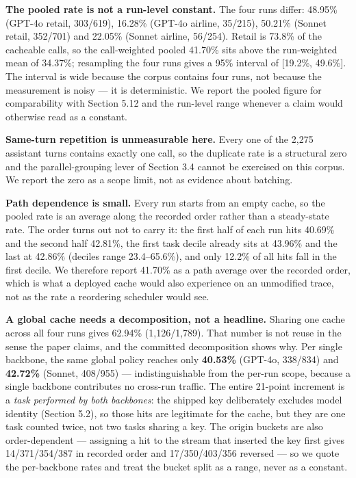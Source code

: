 \documentclass[
  11pt,
]{article}
\begin{document}
\textbf{The pooled rate is not a run-level constant.} The four runs
differ: 48.95\% (GPT-4o retail, 303/619), 16.28\% (GPT-4o airline,
35/215), 50.21\% (Sonnet retail, 352/701) and 22.05\% (Sonnet airline,
56/254). Retail is 73.8\% of the cacheable calls, so the call-weighted
pooled 41.70\% sits above the run-weighted mean of 34.37\%; resampling
the four runs gives a 95\% interval of {[}19.2\%, 49.6\%{]}. The
interval is wide because the corpus contains four runs, not because the
measurement is noisy --- it is deterministic. We report the pooled
figure for comparability with Section 5.12 and the run-level range
whenever a claim would otherwise read as a constant.

\textbf{Same-turn repetition is unmeasurable here.} Every one of the
2,275 assistant turns contains exactly one call, so the duplicate rate
is a structural zero and the parallel-grouping lever of Section 3.4
cannot be exercised on this corpus. We report the zero as a scope limit,
not as evidence about batching.

\textbf{Path dependence is small.} Every run starts from an empty cache,
so the pooled rate is an average along the recorded order rather than a
steady-state rate. The order turns out not to carry it: the first half
of each run hits 40.69\% and the second half 42.81\%, the first task
decile already sits at 43.96\% and the last at 42.86\% (deciles range
23.4--65.6\%), and only 12.2\% of all hits fall in the first decile. We
therefore report 41.70\% as a path average over the recorded order,
which is what a deployed cache would also experience on an unmodified
trace, not as the rate a reordering scheduler would see.

\textbf{A global cache needs a decomposition, not a headline.} Sharing
one cache across all four runs gives 62.94\% (1,126/1,789). That number
is not reuse in the sense the paper claims, and the committed
decomposition shows why. Per single backbone, the same global policy
reaches only \textbf{40.53\%} (GPT-4o, 338/834) and \textbf{42.72\%}
(Sonnet, 408/955) --- indistinguishable from the per-run scope, because
a single backbone contributes no cross-run traffic. The entire 21-point
increment is a \emph{task performed by both backbones}: the shipped key
deliberately excludes model identity (Section 5.2), so those hits are
legitimate for the cache, but they are one task counted twice, not two
tasks sharing a key. The origin buckets are also order-dependent ---
assigning a hit to the stream that inserted the key first gives
14/371/354/387 in recorded order and 17/350/403/356 reversed --- so we
quote the per-backbone rates and treat the bucket split as a range,
never as a constant.
\end{document}
